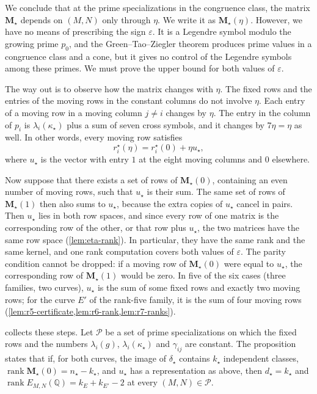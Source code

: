 \documentclass[12pt,oneside,openany]{book}
\theoremstyle{definition}
\theoremstyle{plain}
\numberwithin{equation}{chapter}
\theoremstyle{plain}
\theoremstyle{definition}
\theoremstyle{remark}
\newcommand{\Q}{\mathbb Q}
\DeclareMathOperator{\rk}{rank}
\newcommand{\cP}{\mathcal P}
\newcommand{\eps}{\varepsilon}
\begin{document}
We conclude that at the prime specializations in the congruence class, the matrix $\mathbf M_\star$ depends on $(M,N)$ only through $\eta$. We write it as $\mathbf M_\star(\eta)$. However, we have no means of prescribing the sign $\eps$. It is a Legendre symbol modulo the growing prime $p_0$, and the Green--Tao--Ziegler theorem produces prime values in a congruence class and a cone, but it gives no control of the Legendre symbols among these primes. We must prove the upper bound for both values of $\eps$.

The way out is to observe how the matrix changes with $\eta$. The fixed rows and the entries of the moving rows in the constant columns do not involve $\eta$. Each entry of a moving row in a moving column $j\ne i$ changes by $\eta$. The entry in the column of $p_i$ is $\lambda_i(\kappa_\star)$ plus a sum of seven cross symbols, and it changes by $7\eta=\eta$ as well. In other words, every moving row satisfies
\begin{equation*}
r^\star_i(\eta)=r^\star_i(0)+\eta u_\star,
\end{equation*}
where $u_\star$ is the vector with entry $1$ at the eight moving columns and $0$ elsewhere.

Now suppose that there exists a set of rows of $\mathbf M_\star(0)$, containing an even number of moving rows, such that $u_\star$ is their sum. The same set of rows of $\mathbf M_\star(1)$ then also sums to $u_\star$, because the extra copies of $u_\star$ cancel in pairs. Then $u_\star$ lies in both row spaces, and since every row of one matrix is the corresponding row of the other, or that row plus $u_\star$, the two matrices have the same row space (\cref{lem:eta-rank}). In particular, they have the same rank and the same kernel, and one rank computation covers both values of $\eps$. The parity condition cannot be dropped: if a moving row of $\mathbf M_\star(0)$ were equal to $u_\star$, the corresponding row of $\mathbf M_\star(1)$ would be zero. In five of the six cases (three families, two curves), $u_\star$ is the sum of some fixed rows and exactly two moving rows; for the curve $E'$ of the rank-five family, it is the sum of four moving rows (\cref{lem:r5-certificate,lem:r6-rank,lem:r7-ranks}).

 collects these steps. Let $\cP$ be a set of prime specializations on which the fixed rows and the numbers $\lambda_i(g)$, $\lambda_i(\kappa_\star)$ and $\gamma_{ij}$ are constant. The proposition states that if, for both curves, the image of $\delta_\star$ contains $k_\star$ independent classes, $\rk\mathbf M_\star(0)=n_\star-k_\star$, and $u_\star$ has a representation as above, then $d_\star=k_\star$ and $\rk E_{M,N}(\Q)=k_E+k_{E'}-2$ at every $(M,N)\in\cP$.
\end{document}
